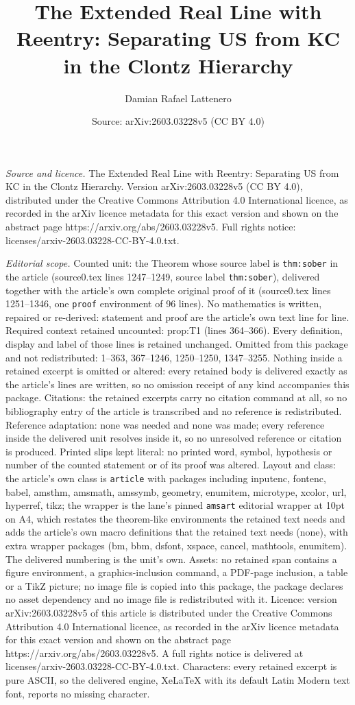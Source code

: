 \documentclass[10pt,a4paper]{amsart}
\title[The Extended Real Line with Reentry: Separating US from KC i]{The Extended Real Line with Reentry: Separating US from KC in the Clontz Hierarchy}
\author{Damian Rafael Lattenero}
\date{Source: arXiv:2603.03228v5 (CC BY 4.0)}
\begin{document}
\maketitle

\noindent\emph{Source and licence.} The Extended Real Line with Reentry: Separating US from KC in the Clontz Hierarchy. Version arXiv:2603.03228v5 (CC BY 4.0), distributed under the Creative Commons Attribution 4.0 International licence, as recorded in the arXiv licence metadata for this exact version and shown on the abstract page https://arxiv.org/abs/2603.03228v5. Full rights notice: licenses/arxiv-2603.03228-CC-BY-4.0.txt.\par\smallskip

\noindent\textit{Editorial scope.} Counted unit: the Theorem whose source label is \texttt{thm:sober} in the article (source0.tex lines 1247--1249, source label \texttt{thm:sober}), delivered together with the article's own complete original proof of it (source0.tex lines 1251--1346, one \texttt{proof} environment of 96 lines). No mathematics is written, repaired or re-derived: statement and proof are the article's own text line for line. Required context retained uncounted: prop:T1 (lines 364--366). Every definition, display and label of those lines is retained unchanged. Omitted from this package and not redistributed: 1--363, 367--1246, 1250--1250, 1347--3255. Nothing inside a retained excerpt is omitted or altered: every retained body is delivered exactly as the article's lines are written, so no omission receipt of any kind accompanies this package. Citations: the retained excerpts carry no citation command at all, so no bibliography entry of the article is transcribed and no reference is redistributed. Reference adaptation: none was needed and none was made; every reference inside the delivered unit resolves inside it, so no unresolved reference or citation is produced. Printed slips kept literal: no printed word, symbol, hypothesis or number of the counted statement or of its proof was altered. Layout and class: the article's own class is \texttt{article} with packages including inputenc, fontenc, babel, amsthm, amsmath, amssymb, geometry, enumitem, microtype, xcolor, url, hyperref, tikz; the wrapper is the lane's pinned \texttt{amsart} editorial wrapper at 10pt on A4, which restates the theorem-like environments the retained text needs and adds the article's own macro definitions that the retained text needs (none), with extra wrapper packages (bm, bbm, dsfont, xspace, cancel, mathtools, enumitem). The delivered numbering is the unit's own. Assets: no retained span contains a figure environment, a graphics-inclusion command, a PDF-page inclusion, a table or a TikZ picture; no image file is copied into this package, the package declares no asset dependency and no image file is redistributed with it. Licence: version arXiv:2603.03228v5 of this article is distributed under the Creative Commons Attribution 4.0 International licence, as recorded in the arXiv licence metadata for this exact version and shown on the abstract page https://arxiv.org/abs/2603.03228v5. A full rights notice is delivered at licenses/arxiv-2603.03228-CC-BY-4.0.txt. Characters: every retained excerpt is pure ASCII, so the delivered engine, XeLaTeX with its default Latin Modern text font, reports no missing character.
\end{document}
